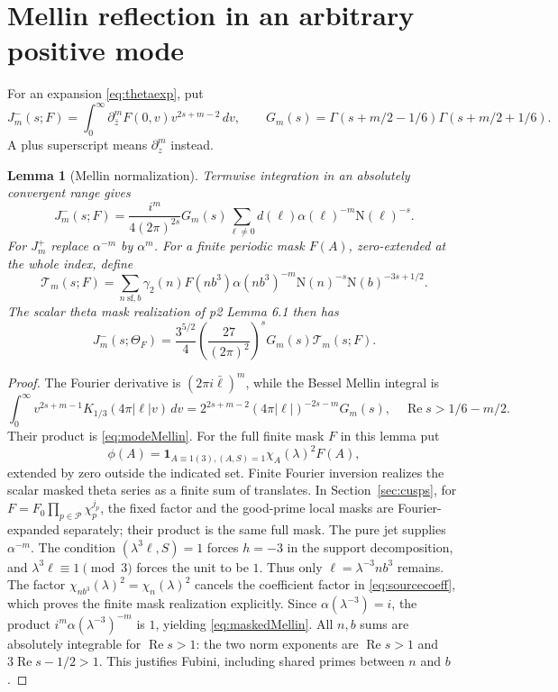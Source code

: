 \documentclass[11pt,a4paper]{article}
\numberwithin{equation}{section}
\newtheorem{lemma}[theorem]{Lemma}
\theoremstyle{definition}
\theoremstyle{remark}
\newcommand{\N}{\mathrm N}
\newcommand{\ind}{\mathbf 1}
\newcommand{\dd}{\,d}
\newcommand{\Rea}{\operatorname{Re}}
\begin{document}
\section{Mellin reflection in an arbitrary positive mode}\label{sec:mellin}
For an expansion \eqref{eq:thetaexp}, put
\[
 J_m^-(s;F)=\int_0^\infty\partial_{\bar z}^mF(0,v)v^{2s+m-2}\dd v,\qquad
 G_m(s)=\Gamma(s+m/2-1/6)\Gamma(s+m/2+1/6).
\]
A plus superscript means $\partial_z^m$ instead.
\begin{lemma}[Mellin normalization]\label{lem:mellin}
Termwise integration in an absolutely convergent range gives
\begin{equation}\label{eq:modeMellin}
 J_m^-(s;F)=\frac{i^m}{4(2\pi)^{2s}}G_m(s)
 \sum_{\ell\ne0}d(\ell)\alpha(\ell)^{-m}\N(\ell)^{-s}.
\end{equation}
For $J_m^+$ replace $\alpha^{-m}$ by $\alpha^m$.
For a finite periodic mask $F(A)$, zero-extended at the whole index, define
\[
 \mathcal T_m(s;F)=\sum_{n\ \mathrm{sf},b}\gamma_2(n)F(nb^3)\alpha(nb^3)^{-m}
 \N(n)^{-s}\N(b)^{-3s+1/2}.
\]
The scalar theta mask realization of p2 Lemma 6.1 then has
\begin{equation}\label{eq:maskedMellin}
 J_m^-(s;\Theta_F)=\frac{3^{5/2}}4
 \left(\frac{27}{(2\pi)^2}\right)^sG_m(s)\mathcal T_m(s;F).
\end{equation}
\end{lemma}
\begin{proof}
The Fourier derivative is $(2\pi i\bar\ell)^m$, while the Bessel Mellin integral \cite[(10.43.19)]{DLMF} is
\[
 \int_0^\infty v^{2s+m-1}K_{1/3}(4\pi|\ell|v)\dd v
 =2^{2s+m-2}(4\pi|\ell|)^{-2s-m}G_m(s),
 \quad\Rea s>1/6-m/2.
\]
Their product is \eqref{eq:modeMellin}. For the full finite mask $F$ in this lemma put
\[
 \phi(A)=\ind_{A\equiv1(3),(A,S)=1}\chi_A(\lambda)^2F(A),
\]
extended by zero outside the indicated set. Finite Fourier inversion realizes the scalar masked theta series as a finite sum of translates. In Section~\ref{sec:cusps}, for $F=F_0\prod_{p\in\mathcal P}\chi_p^{j_p}$, the fixed factor and the good-prime local masks are Fourier-expanded separately; their product is the same full mask. The pure jet supplies $\alpha^{-m}$. The condition $(\lambda^3\ell,S)=1$ forces $h=-3$ in the support decomposition, and $\lambda^3\ell\equiv1\pmod3$ forces the unit to be $1$. Thus only $\ell=\lambda^{-3}nb^3$ remains. The factor $\chi_{nb^3}(\lambda)^2=\chi_n(\lambda)^2$ cancels the coefficient factor in \eqref{eq:sourcecoeff}, which proves the finite mask realization explicitly. Since $\alpha(\lambda^{-3})=i$, the product $i^m\alpha(\lambda^{-3})^{-m}$ is $1$, yielding \eqref{eq:maskedMellin}. All $n,b$ sums are absolutely integrable for $\Rea s>1$: the two norm exponents are $\Rea s>1$ and $3\Rea s-1/2>1$. This justifies Fubini, including shared primes between $n$ and $b$.
\end{proof}
\end{document}
